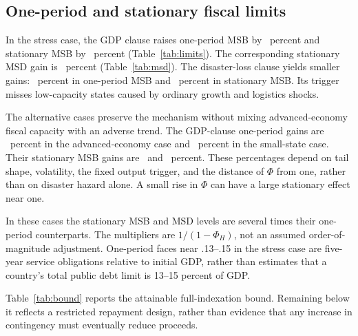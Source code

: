 \documentclass[11pt]{article}
\newcommand{\FitTable}[1]{\sbox{\tablebox}{#1}\ifdim\wd\tablebox>\linewidth\resizebox{\linewidth}{!}{\usebox{\tablebox}}\else\usebox{\tablebox}\fi}
\begin{document}
\subsection{One-period and stationary fiscal limits}\label{subsec:limits}
\begin{table}[t]
\centering\caption{Maximum sustainable borrowing and default at the optimum. Parentheses are Monte Carlo SEs of the mean. One-period and stationary gains are relative to the corresponding straight-debt limit.}\label{tab:limits}
\FitTable{}
\end{table}
\begin{table}[t]
\centering\caption{Face values attaining MSB: one-period and stationary MSD. These are promised repayments in GDP units, not issuance proceeds.}\label{tab:msd}
\FitTable{}
\end{table}
In the stress case, the GDP clause raises one-period MSB by \StressGDPOneGain\ percent and stationary MSB by \StressGDPStationaryGain\ percent (Table~\ref{tab:limits}). The corresponding stationary MSD gain is \StressGDPMSDGain\ percent (Table~\ref{tab:msd}). The disaster-loss clause yields smaller gains: \StressDisasterOneGain\ percent in one-period MSB and \StressDisasterStationaryGain\ percent in stationary MSB. Its trigger misses low-capacity states caused by ordinary growth and logistics shocks.

The alternative cases preserve the mechanism without mixing advanced-economy fiscal capacity with an adverse trend. The GDP-clause one-period gains are \AdvancedGDPOneGain\ percent in the advanced-economy case and \SmallGDPOneGain\ percent in the small-state case. Their stationary MSB gains are \AdvancedGDPStationaryGain\ and \SmallGDPStationaryGain\ percent. These percentages depend on tail shape, volatility, the fixed output trigger, and the distance of $\Phi$ from one, rather than on disaster hazard alone. A small rise in $\Phi$ can have a large stationary effect near one.

In these cases the stationary MSB and MSD levels are several times their one-period counterparts. The multipliers are $1/(1-\Phi_H)$, not an assumed order-of-magnitude adjustment. One-period faces near .13--.15 in the stress case are five-year service obligations relative to initial GDP, rather than estimates that a country's total public debt limit is 13--15 percent of GDP.

\begin{table}[t]
\centering\caption{The risk-neutral resource bound and the fraction attained by each step design (percent). The bound uses the analytic mean of $g$; reported step proceeds average simulations.}\label{tab:bound}
\FitTable{}
\end{table}
Table~\ref{tab:bound} reports the attainable full-indexation bound. Remaining below it reflects a restricted repayment design, rather than evidence that any increase in contingency must eventually reduce proceeds.
\end{document}
